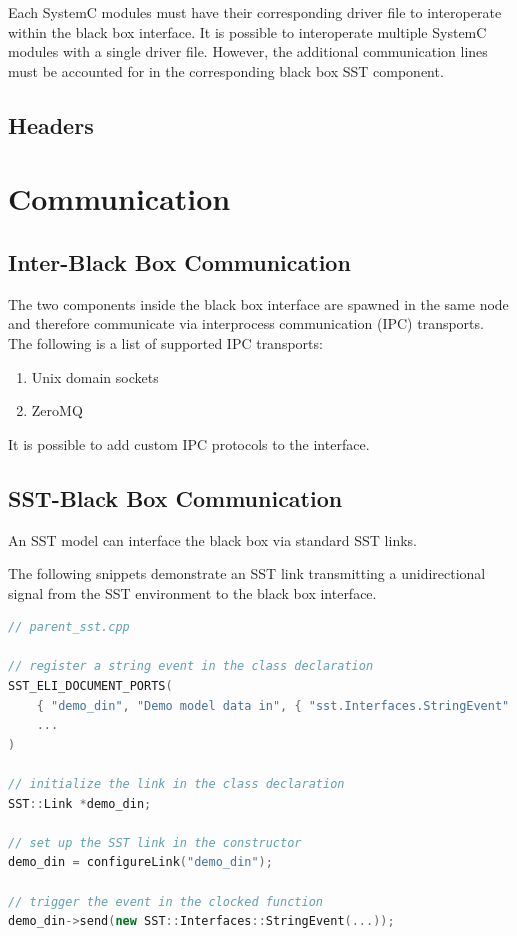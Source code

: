 \documentclass{article}
\begin{document}
      Each SystemC modules must have their corresponding driver file to interoperate within the black box interface. It is possible to interoperate multiple SystemC modules with a single driver file. However, the additional communication lines must be accounted for in the corresponding black box SST component.

      \subsection{Headers}

    \section{Communication} \label{sec:comm}

      \subsection{Inter-Black Box Communication}
      The two components inside the black box interface are spawned in the same node and therefore communicate via interprocess communication (IPC) transports. The following is a list of supported IPC transports:
      \begin{enumerate}
          \item Unix domain sockets
          \item ZeroMQ
      \end{enumerate}

      It is possible to add custom IPC protocols to the interface.

      \subsection{SST-Black Box Communication}
      An SST model can interface the black box via standard SST links.

      The following snippets demonstrate an SST link transmitting a unidirectional signal from the SST environment to the black box interface.

\begin{lstlisting}[language=C++]
// parent_sst.cpp

// register a string event in the class declaration
SST_ELI_DOCUMENT_PORTS(
    { "demo_din", "Demo model data in", { "sst.Interfaces.StringEvent" }},
    ...
)

// initialize the link in the class declaration
SST::Link *demo_din;

// set up the SST link in the constructor
demo_din = configureLink("demo_din");

// trigger the event in the clocked function
demo_din->send(new SST::Interfaces::StringEvent(...));
\end{lstlisting}
\end{document}
